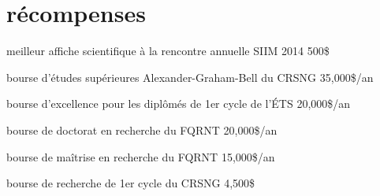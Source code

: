 \documentclass[]{friggeri-cv}
\newif\ifenglish
\begin{document}
\ifenglish\section{awards}\else\section{récompenses}\fi

\begin{entrylist}
  \ifenglish
    \entry {2014} {best scientific poster at the annual SIIM meeting} {500\$} {\vspace{-3mm}}
  \else
     {meilleur affiche scientifique à la rencontre annuelle SIIM 2014} {500\$} {\vspace{-3mm}}
  \fi
  \ifenglish
    \entry {2011} {CRSNG doctoral Alexander-Graham-Bell scholarship} {35,000\$/an} {\vspace{-3mm}}
  \else
     {bourse d’études supérieures Alexander-Graham-Bell du CRSNG} {35,000\$/an} {\vspace{-3mm}}
  \fi
  \ifenglish
    \entry {2011} {excellence scholarship for graduate student of the ÉTS} {20,000\$/an} {\vspace{-3mm}}
  \else
     {bourse d'excellence pour les diplômés de 1er cycle de l'ÉTS} {20,000\$/an} {\vspace{-3mm}}
  \fi
  \ifenglish
    \entry {2011} {FQRNT doctoral research scholarship} {20,000\$/an} {\vspace{-3mm}}
  \else
     {bourse de doctorat en recherche du FQRNT} {20,000\$/an} {\vspace{-3mm}}
  \fi
  \ifenglish
    \entry {2009} {FQRNT master's research scholarship} {15,000\$/an} {\vspace{-3mm}}
  \else
     {bourse de maîtrise en recherche du FQRNT} {15,000\$/an} {\vspace{-3mm}}
  \fi
  \ifenglish
    \entry {2006} {{\small CRSNG }  undergraduate student research awards} {4,500\$} {\vspace{-3mm}}
  \else
     {bourse de recherche de 1er cycle du CRSNG} {4,500\$} {\vspace{-3mm}}
  \fi
\end{entrylist}
\end{document}
